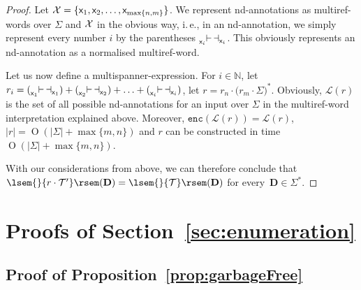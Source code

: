 \documentclass[
a4paper
]{article}
\theoremstyle{plain}
\theoremstyle{definition}
\theoremstyle{remark}
\newcommand{\varset}{\mbox{\ensuremath{\mathcal{X}}}}
\DeclareMathOperator{\openmark}{\vdash}
\DeclareMathOperator{\closemark}{\dashv}
\newcommand{\doc}{\ensuremath{\mathbf{D}}}
\newcommand{\open}[1]{\prescript{}{#1}{\openmark}}
\newcommand{\close}[1]{\closemark_{#1}}
\newcommand{\varsx}{\ensuremath{\textsf{x}}}
\newcommand{\lang}[1]{\ensuremath{\mathcal{L}(#1)}}
\newcommand{\nrefw}[1]{\ensuremath{\mathtt{enc}(#1)}}
\newcommand{\sst}{\mathcal{T}}
\newcommand{\sem}[1]{{\lsem{}{#1}\rsem}}
\DeclareMathOperator{\bigo}{O}
\begin{document}
\begin{proof}
Let $\varset = \{\varsx_1, \varsx_2, \ldots, \varsx_{\max\{n, m\}}\}$. We represent nd-annotations as multiref-words over $\Sigma$ and $\varset$ in the obvious way, i.\,e., in an nd-annotation, we simply represent every number $i$ by the parentheses $\open{\varsx_i} \close{\varsx_i}$. This obviously represents an nd-annotation as a normalised multiref-word. 

Let us now define a multispanner-expression. For $i \in \mathbb{N}$, let $r_i = (\open{\varsx_1} \close{\varsx_1}) + (\open{\varsx_2} \close{\varsx_2}) + \ldots + (\open{\varsx_i} \close{\varsx_i})$, let $r = r_n \cdot \big(r_m \cdot \Sigma \big)^*$. Obviously, $\lang{r}$ is the set of all possible nd-annotations for an input over $\Sigma$ in the multiref-word interpretation explained above. Moreover, $\nrefw{\lang{r}} = \lang{r}$, $|r| = \bigo(|\Sigma| + \max\{m, n\})$ and $r$ can be constructed in time $\bigo(|\Sigma| + \max\{m, n\})$.

With our considerations from above, we can therefore conclude that $\sem{r \cdot \sst'}(\doc) = \sem{\sst}(\doc)$ for every~$\doc \in \Sigma^*$.
\end{proof}

	
\section{Proofs of Section~\ref{sec:enumeration}}\label{sec:enumAppendix}
	
\subsection{Proof of Proposition~\ref{prop:garbageFree}}
\end{document}

